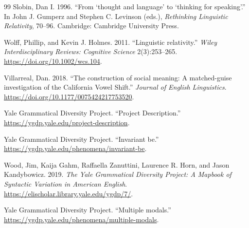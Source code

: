 \documentclass[11pt]{article}
\begin{document}
\begin{thebibliography}{99}
Slobin, Dan I. 1996.
``From `thought and language' to `thinking for speaking'.''
In John J. Gumperz and Stephen C. Levinson (eds.),
\emph{Rethinking Linguistic Relativity}, 70--96.
Cambridge: Cambridge University Press.

Wolff, Phillip, and Kevin J. Holmes. 2011.
``Linguistic relativity.''
\emph{Wiley Interdisciplinary Reviews: Cognitive Science} 2(3):253--265.
\url{https://doi.org/10.1002/wcs.104}.

Villarreal, Dan. 2018.
``The construction of social meaning: A matched-guise investigation of the
California Vowel Shift.''
\emph{Journal of English Linguistics}.
\url{https://doi.org/10.1177/0075424217753520}.

Yale Grammatical Diversity Project.
``Project Description.''
\url{https://ygdp.yale.edu/project-description}.

Yale Grammatical Diversity Project.
``Invariant be.''
\url{https://ygdp.yale.edu/phenomena/invariant-be}.

Wood, Jim, Kaija Gahm, Raffaella Zanuttini, Laurence R. Horn, and Jason
Kandybowicz. 2019.
\emph{The Yale Grammatical Diversity Project: A Mapbook of Syntactic Variation
in American English}.
\url{https://elischolar.library.yale.edu/ygdp/7/}.

Yale Grammatical Diversity Project.
``Multiple modals.''
\url{https://ygdp.yale.edu/phenomena/multiple-modals}.

\end{thebibliography}
\end{document}

